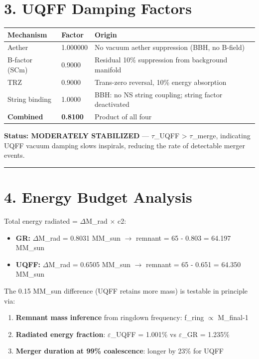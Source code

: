 \documentclass[11pt]{article}
\begin{document}
\section*{3. UQFF Damping Factors}

\begin{center}
\begin{longtable}{lll}
\toprule
Mechanism & Factor & Origin \tabularnewline
\midrule
\endhead
Aether & 1.000000 & No vacuum aether suppression (BBH, no B-field) \tabularnewline
B-factor (SCm) & 0.9000 & Residual 10\% suppression from background manifold \tabularnewline
TRZ & 0.9000 & Trans-zero reversal, 10\% energy absorption \tabularnewline
String binding & 1.0000 & BBH: no NS string coupling; string factor deactivated \tabularnewline
\textbf{Combined} & \textbf{0.8100} & Product of all four \tabularnewline
\bottomrule
\end{longtable}
\end{center}

\textbf{Status: MODERATELY STABILIZED} --- $\tau$\_UQFF > $\tau$\_merge, indicating UQFF vacuum damping slows inspirals, reducing the rate of detectable merger events.

\noindent\rule{\textwidth}{0.4pt}

\section*{4. Energy Budget Analysis}

Total energy radiated = $\Delta$M\_rad $\times$ c2:

\begin{itemize}
  \item \textbf{GR:} $\Delta$M\_rad = 0.8031 MM\_sun $\to$ remnant = 65 - 0.803 = 64.197 MM\_sun  
  \item \textbf{UQFF:} $\Delta$M\_rad = 0.6505 MM\_sun $\to$ remnant = 65 - 0.651 = 64.350 MM\_sun
\end{itemize}

The 0.15 MM\_sun difference (UQFF retains more mass) is testable in principle via:

\begin{enumerate}
  \item \textbf{Remnant mass inference} from ringdown frequency: f\_ring $\propto$ M\_final-1
  \item \textbf{Radiated energy fraction}: $\varepsilon$\_UQFF = 1.001\% vs $\varepsilon$\_GR = 1.235\%
  \item \textbf{Merger duration at 99\% coalescence}: longer by 23\% for UQFF
\end{enumerate}
\end{document}
